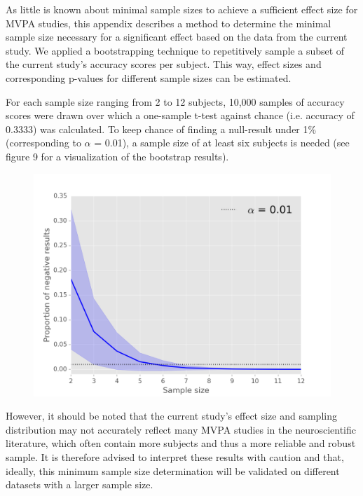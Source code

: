 \documentclass[jou,12pt,a4paper]{apa6}
\begin{document}
\noindent As little is known about minimal sample sizes to achieve a sufficient effect size for MVPA studies, this appendix describes a method to determine the minimal sample size necessary for a significant effect based on the data from the current study. We applied a bootstrapping technique to repetitively sample a subset of the current study's accuracy scores per subject. This way, effect sizes and corresponding p-values for different sample sizes can be estimated.

For each sample size ranging from 2 to 12 subjects, 10,000 samples of accuracy scores were drawn over which a one-sample t-test against chance (i.e. accuracy of 0.3333) was calculated. To keep chance of finding a null-result under 1\% (corresponding to $\alpha$ = 0.01), a sample size of at least six subjects is needed (see figure 9 for a visualization of the bootstrap results). 

\begin{figure}[ht]
\centering
\includegraphics[scale=.7]{bootstrap_results}
\end{figure}

However, it should be noted that the current study's effect size and sampling distribution may not accurately reflect many MVPA studies in the neuroscientific literature, which often contain more subjects and thus a more reliable and robust sample. It is therefore advised to interpret these results with caution and that, ideally, this minimum sample size determination will be validated on different datasets with a larger sample size. 
\end{document}
